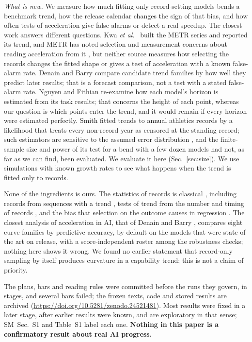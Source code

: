 \documentclass[aps,pre,twocolumn,superscriptaddress,nofootinbib,10pt]{revtex4-2}
\newcommand{\SM}{SM}
\begin{document}
\emph{What is new.} We measure how much fitting only record-setting models bends a benchmark trend, how the release calendar changes the sign of that bias, and how often tests of acceleration give false alarms or detect a real speedup. The closest work answers different questions. Kwa \emph{et al.}\ \cite{kwa2025} built the METR series and reported its trend, and METR has noted selection and measurement concerns about reading acceleration from it \cite{metr2026limits}, but neither source measures how selecting the records changes the fitted shape or gives a test of acceleration with a known false-alarm rate. Denain and Barry \cite{denain2026} compare candidate trend families by how well they predict later results; that is a forecast comparison, not a test with a stated false-alarm rate. Nguyen and Fithian \cite{nguyen2026} re-examine how each model's horizon is estimated from its task results; that concerns the height of each point, whereas our question is which points enter the trend, and it would remain if every horizon were estimated perfectly. Smith \cite{smith1988} fitted trends to annual athletics records by a likelihood that treats every non-record year as censored at the standing record; such estimators are sensitive to the assumed error distribution \cite{feuerverger1996}, and the finite-sample size and power of its test for a bend with a few dozen models had not, as far as we can find, been evaluated. We evaluate it here (Sec.~\ref{sec:size}). We use simulations with known growth rates to see what happens when the trend is fitted only to records.

None of the ingredients is ours. The statistics of records is classical \cite{arnold1998}, including records from sequences with a trend \cite{ballerini1985,ballerini1987b,franke2010,wergen2013,wiuff2026}, tests of trend from the number and timing of records \cite{foster1954,cebrian2021}, and the bias that selection on the outcome causes in regression \cite{heckman1979}. The closest analysis of acceleration in AI, that of Denain and Barry \cite{denain2026}, compares eight curve families by predictive accuracy, by default on the models that were state of the art on release, with a score-independent roster among the robustness checks; nothing here shows it wrong. We found no earlier statement that record-only sampling by itself produces curvature in a capability trend; this is not a claim of priority.

The plans, bars and reading rules were committed before the runs they govern, in stages, and several bars failed; the frozen texts, code and stored results are archived (\url{https://doi.org/10.5281/zenodo.24521481}). Most results were fixed in a later stage, after earlier results were known, and are exploratory in that sense; \SM\ Sec.~S1 and Table~S1 label each one. \textbf{Nothing in this paper is a confirmatory result about real AI progress.}
\end{document}
